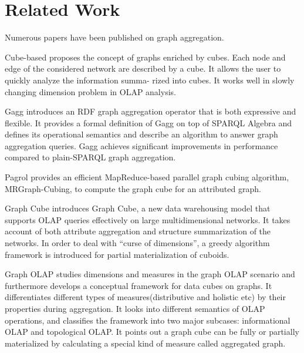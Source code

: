 \section{Related Work}

Numerous papers have been published on graph aggregation. 

Cube-based \cite{DBLP:conf/sofsem/JakawatFL16} proposes the concept of  graphs enriched by cubes. Each node and edge of the considered network are described by a cube. It allows the user to quickly analyze the information summa-
rized into cubes. It works well in slowly changing dimension problem in OLAP analysis.

Gagg \cite{DBLP:conf/esws/MaaliCD15} introduces an RDF graph aggregation operator that is both expressive and flexible. It provides a formal definition of Gagg on top of SPARQL Algebra and defines its operational semantics and describe an algorithm to answer graph aggregation queries. Gagg achieves significant improvements in performance compared to plain-SPARQL graph aggregation.

Pagrol \cite{DBLP:conf/icde/WangFWTAA14} provides an efficient MapReduce-based parallel graph
cubing algorithm, MRGraph-Cubing, to compute the graph cube
for an attributed graph. 

Graph Cube \cite{DBLP:conf/sigmod/ZhaoLXH11} introduces Graph Cube, a new data warehousing model that supports OLAP queries effectively on large multidimensional networks. It takes account of both attribute aggregation and structure summarization of the networks. In order to deal with “curse of dimensions”, a greedy algorithm framework is introduced for partial materialization of cuboids.

Graph OLAP \cite{DBLP:conf/icdm/ChenYZHY08} studies dimensions and measures in the graph OLAP scenario and furthermore develops a conceptual framework for data cubes on graphs. It differentiates different types of measures(distributive and holistic etc) by their properties during aggregation. It looks into different semantics of OLAP operations, and classifies the framework into two major subcases: informational OLAP and topological OLAP. It points out a graph cube can be fully or partially materialized by calculating a special kind of measure called aggregated graph. 


